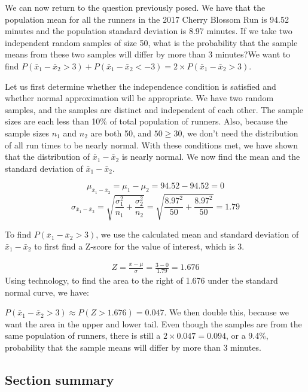 \begin{examplewrap}
\begin{nexample}{
We can now return to the question previously posed. We have that the population mean for all the runners in the 2017 Cherry Blossom Run is 94.52 minutes and the population standard deviation is 8.97 minutes.  If we take two independent random samples of size 50, what is the probability that the sample means from these two samples will differ by more than 3 minutes?}We want to find $P(\bar{x}_1 - \bar{x}_2> 3) + P(\bar{x}_1 - \bar{x}_2< -3)=2\times P(\bar{x}_1 - \bar{x}_2 > 3)$.  

Let us first determine whether the independence condition is satisfied and whether normal approximation will be appropriate.  We have two random samples, and the samples are distinct and independent of each other.  The sample sizes are each less than 10\% of total population of runners.  Also, because the sample sizes $n_1$ and $n_2$ are both 50, and $50 \ge 30$, we don't need the distribution of all run times to be nearly normal.  With these conditions met, we have shown that the distribution of $\bar{x}_1-\bar{x}_2$ is nearly normal.  We now find the mean and the standard deviation of $\bar{x}_1-\bar{x}_2$.  

$$\mu_{\bar{x}_1-\bar{x}_2} = \mu_1-\mu_2 = 94.52-94.52 = 0$$
$$ \sigma_{\bar{x}_1-\bar{x}_2}=  \sqrt{\frac{\sigma_1^2}{n_1} + \frac{\sigma_2^2}{n_2}}=    \sqrt{\frac{8.97^2}{50} + \frac{8.97^2}{50}}= 1.79$$


To find $P(\bar{x}_1-\bar{x}_2>3)$, we use the calculated mean and standard deviation of $\bar{x}_1-\bar{x}_2$ to first find a Z-score for the value of interest, which is 3.

\begin{align*}
Z = \frac{x - \mu}{\sigma} = \frac{3 - 0}{1.79}=1.676
\end{align*}
Using technology, to find the area to the right of 1.676 under the standard normal curve, we have:

$P(\bar{x}_1-\bar{x}_2>3)\approx P(Z > 1.676) = 0.047$.  We then double this, because we want the area in the upper and lower tail.   Even though the samples are from the same population of runners, there is still a $2\times 0.047 = 0.094$, or a 9.4\%, probability that the sample means will differ by more than 3 minutes.  
\end{nexample}
\end{examplewrap}


\subsection*{Section summary}


